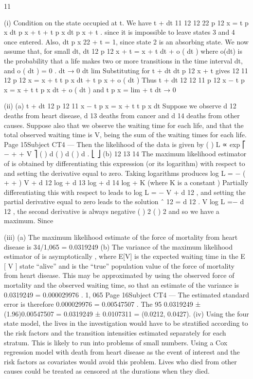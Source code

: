 11
\item (i)
Condition on the state occupied at t.
We have
t + dt
11
12
12
22
p 12
x = t p x dt p x + t + t p x dt p x + t .
since it is impossible to leave states 3 and 4 once entered.
Also,
dt
p x 22 + t = 1,
since state 2 is an absorbing state.
We now assume that, for small dt,
dt
12
p 12
x + t = \mu x + t dt + o ( dt )
where o(dt) is the probability that a life makes two or more transitions in the
time interval dt, and
o ( dt )
= 0 .
dt → 0 dt
lim
Substituting for
t + dt
dt
p 12
x + t gives
12
11
12
p 12
x = \mu x + t t p x dt + t p x + o ( dt )
Thus
t + dt
12
12
11
p 12
x − t p x = \mu x + t t p x dt + o ( dt )
and
t p x = lim +
\partial t
dt → 0
\item (ii)
(a)
t + dt
12
p 12
11
x − t p x
= 
x + t t p x
dt
Suppose we observe d 12 deaths from heart disease, d 13 deaths from
cancer and d 14 deaths from other causes.
Suppose also that we observe the waiting time for each life, and that
the total observed waiting time is V, being the sum of the waiting times
for each life.
Page 15Subject CT4 — %
Then the likelihood of the data is given by
(
)
L ∝ exp ⎡ −  +  +  V ⎤ (  ) d (  ) d (  ) d .
⎣
⎦
(b)
12
13
14
The maximum likelihood estimator of  is obtained by
differentiating this expression (or its logarithm) with respect to 
and setting the derivative equal to zero.
Taking logarithms produces
log L = − (  +  +  ) V + d 12 log  + d 13 log  + d 14 log  + K
(where K is a constant )
Partially differentiating this with respect to  leads to
\partial log L
\partial{}
= − V +
d 12
,
and setting the partial derivative equal to zero leads to the solution
\mu ˆ 12 =
d 12
.
V
 log L
=−
d 12
, the second derivative is always negative
( \partial{} ) 2
(  ) 2
and so we have a maximum.
Since
\item (iii)
(a) The maximum likelihood estimate of the force of mortality from heart
disease is 34/1,065 = 0.0319249
(b) The variance of the maximum likelihood estimator of  is
asymptotically
, where E[V] is the expected waiting time in the
E [ V ]
state “alive” and  is the “true” population value of the force of
mortality from heart disease.
This may be approximated by using the observed force of mortality
and the observed waiting time, so that an estimate of the variance is
0.0319249
= 0.000029976 .
1, 065
Page 16Subject CT4 — %
The estimated standard error is therefore
0.000029976 = 0.00547507 .
The 95%
0.0319249 ± (1.96)0.00547507 = 0.0319249 ± 0.0107311
= (0.0212, 0.0427).
(iv)
Using the four state model, the lives in the investigation would have to be
stratified according to the risk factors and the transition intensities estimated
separately for each stratum.
This is likely to run into problems of small numbers.
Using a Cox regression model with death from heart disease as the event of
interest and the risk factors as covariates would avoid this problem.
Lives who died from other causes could be treated as censored at the durations
when they died.
